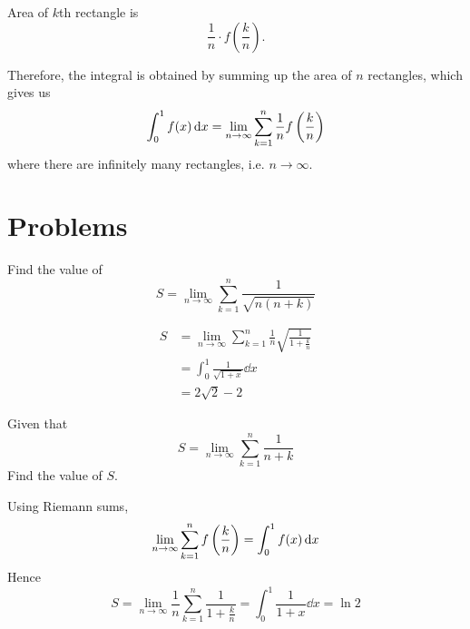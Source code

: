 Area of $k$th rectangle is 
\[ \frac{1}{n} \cdot f\left(\frac{k}{n}\right).\]

Therefore, the integral is obtained by summing up the area of $n$ rectangles, which gives us
\begin{equation} 
\int_{0}^{1} f(x) \dd{x} = \lim_{n \to \infty} \sum_{k=1}^{n} \frac{1}{n} f\left(\frac{k}{n}\right) 
\end{equation}
where there are infinitely many rectangles, i.e. $n \to \infty$.
\pagebreak

\section*{Problems}
\begin{prbm}
Find the value of 
\[ S = \lim_{n \to \infty} \sum_{k=1}^{n} \frac{1}{\sqrt{n(n+k)}} \]
\end{prbm}
    
\begin{solution}
\begin{align*}
S &= \lim_{n \to \infty} \sum_{k=1}^{n} \frac{1}{n} \sqrt{\frac{1}{1+\frac{k}{n}}}\\
&= \int_{0}^{1} \frac{1}{\sqrt{1+x}} \dd{x}\\
&= 2\sqrt{2} - 2
\end{align*}
\end{solution}

\begin{prbm}
Given that
\[ S=\lim_{n\to\infty}\sum_{k=1}^n\frac{1}{n+k} \]
Find the value of $S$.
\end{prbm}
\begin{solution}
Using Riemann sums,
\[ \lim_{n\to\infty}\sum_{k=1}^nf\left(\frac{k}{n}\right) = \int_0^1f(x)\dd{x} \]
Hence
\[ S = \lim_{n\to\infty}\frac{1}{n}\sum_{k=1}^n\frac{1}{1+\frac{k}{n}} = \int_0^1\frac{1}{1+x}\dd{x} = \boxed{\ln2} \]
\end{solution}

